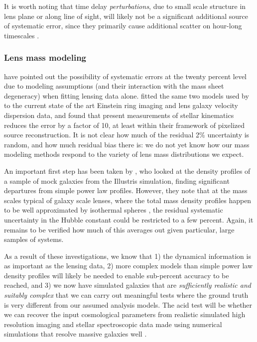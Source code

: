 It is worth noting that time delay {\it perturbations},  due to small
scale structure in lens plane or along line of sight, will likely not be
a significant  additional source of systematic error, since they
primarily cause additional scatter on hour-long timescales
\citep{K+M09}.


\subsubsection{Lens mass modeling}

\citet{S+S13} have pointed out the possibility of systematic errors at
the twenty percent level due to modeling assumptions (and their
interaction with the mass sheet degeneracy) when fitting lensing data
alone. \citet{Suy++14} fitted the same two models used by
\citet{S+S13}  to the current state of the art Einstein ring imaging and
lens galaxy velocity dispersion data, and found that present
measurements of stellar kinematics reduces the error by a factor of
10, at least within their framework of pixelized source
reconstruction.  It is not clear how much of the residual 2\%
uncertainty is random, and how much residual bias there is: we do not
yet know how our mass modeling methods respond to the variety of lens
mass distributions we expect.

An important first step has been taken by \citet{XuEtal2016}, who
looked at the density profiles of a sample of mock galaxies from the
Illustris simulation, finding significant departures from simple power
law profiles. However, they note that at the mass scales typical of
galaxy scale lenses, where the total mass density profiles happen to
be well approximated by isothermal spheres
\citep{Koo++09,Aug++10}, the residual systematic uncertainty
in the Hubble constant could be restricted to a few percent.
Again, it remains to be verified how much of this averages out
given particular, large samples of systems.

As a result of these investigations, we know that 1) the dynamical
information is as important as the lensing data, 2) more complex
models than simple power law density profiles will likely be needed to
enable sub-percent accuracy to be reached, and 3) we now have
simulated galaxies that are {\it sufficiently realistic and suitably
complex} that we can carry out meaningful tests where the ground truth
is very different from our assumed analysis models. The acid test will
be whether we can recover the input cosmological parameters from
realistic simulated high resolution imaging and stellar spectroscopic
data made using numerical simulations that resolve massive
galaxies well \citep[e.g.,][]{Fia++16}.


